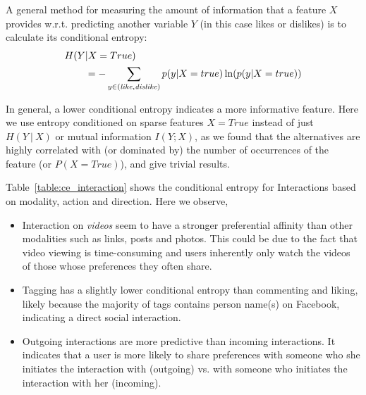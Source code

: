 A general method for measuring the amount of information that a 
feature $X$ provides w.r.t. predicting another variable $Y$ (in this
case likes or dislikes) is to calculate its conditional entropy:
\begin{align*}
H(Y&|X=True)\\
& = -\sum_{y\in{(\like,\dislike)}} p(y|X=true) \ln( p(y|X=true))
\end{align*}

In general, a lower conditional entropy indicates a more informative
feature. Here we use entropy conditioned on sparse features $X=True$ 
instead of just $H(Y~|~X)$ or mutual information $I(Y; X)$, as we found 
that the alternatives are highly correlated with (or dominated by) the number of 
occurrences of the feature (or $P(X=True)$), and give trivial results. 

Table~\ref{table:ce_interaction} shows the conditional entropy for Interactions based on modality, action and direction. Here we observe,
\begin{itemize}
\item Interaction on {\em videos} seem to have a stronger preferential affinity 
than other modalities such as links, posts and photos.  This could be
  due to the fact that video viewing is time-consuming and users
  inherently only watch the videos of those whose preferences they
  often share.
\item Tagging has a slightly lower conditional entropy than
  commenting and liking, likely because the majority of tags contains 
  person name(s) on Facebook, indicating a direct social interaction. 
\item Outgoing interactions are more predictive than incoming interactions.
  It indicates that a user is more likely to share preferences with someone who she
  initiates the interaction with (outgoing) vs. with someone who
  initiates the interaction with her (incoming).  
\end{itemize}

